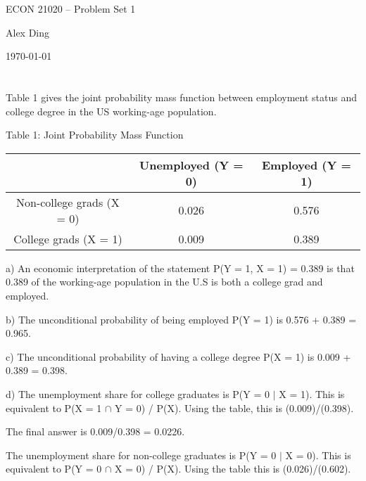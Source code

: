 



{\LARGE \centering ECON 21020 -- Problem Set 1\par}
{\vspace{-1em} \large \centering Alex Ding \par}
{\centering \vspace{-1em} \today \par }

\section{}
Table 1 gives the joint probability mass function between employment status and college degree in the US working-age population.
\begin{center}
Table 1: Joint Probability Mass Function
\end{center}

\begin{table}[h!]
\centering
 \begin{tabular}{||c c c||} 
 \hline
 & Unemployed (Y = 0) & Employed (Y = 1)  \\ [0.5ex] 
 \hline\hline
 Non-college grads (X = 0) & 0.026 & 0.576 \\ 
 College grads (X = 1) & 0.009 & 0.389 \\ [1ex] 
 \hline
 \end{tabular}
\end{table}
 a) An economic interpretation of the statement P(Y = 1, X = 1) = 0.389 is that 0.389 of the working-age population in the U.S is both a college grad and employed.
 
 b) The unconditional probability of being employed P(Y = 1) is 0.576 + 0.389 = 0.965.
 
 c) The unconditional probability of having a college degree P(X = 1) is 0.009 + 0.389 = 0.398.
 
 d) The unemployment share for college graduates is P(Y = 0 $\mid$ X = 1). 
 This is equivalent to P(X = 1 $\cap$ Y = 0) / P(X). Using the table, this is (0.009)/(0.398).
 
 The final answer is 0.009/0.398 = 0.0226.
 
 The unemployment share for non-college graduates is P(Y = 0 $\mid$ X = 0). This is equivalent to P(Y = 0 $\cap$ X = 0) / P(X). 
 Using the table this is (0.026)/(0.602).

